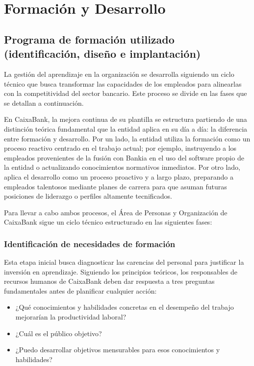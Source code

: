 \chapter{Formación y Desarrollo}

\section{Programa de formación utilizado (identificación, diseño e implantación)}

La gestión del aprendizaje en la organización se desarrolla siguiendo un ciclo técnico que busca transformar las capacidades de los empleados para alinearlas con la competitividad del sector bancario. Este proceso se divide en las fases que se detallan a continuación.

En CaixaBank, la mejora continua de su plantilla se estructura partiendo de una distinción teórica fundamental que la entidad aplica en su día a día: la diferencia entre formación y desarrollo. Por un lado, la entidad utiliza la formación como un proceso reactivo centrado en el trabajo actual; por ejemplo, instruyendo a los empleados provenientes de la fusión con Bankia en el uso del software propio de la entidad o actualizando conocimientos normativos inmediatos. Por otro lado, aplica el desarrollo como un proceso proactivo y a largo plazo, preparando a empleados talentosos mediante planes de carrera para que asuman futuras posiciones de liderazgo o perfiles altamente tecnificados.

Para llevar a cabo ambos procesos, el Área de Personas y Organización de CaixaBank sigue un ciclo técnico estructurado en las siguientes fases:

\subsection{Identificación de necesidades de formación}

Esta etapa inicial busca diagnosticar las carencias del personal para justificar la inversión en aprendizaje. Siguiendo los principios teóricos, los responsables de recursos humanos de CaixaBank deben dar respuesta a tres preguntas fundamentales antes de planificar cualquier acción:

\begin{itemize}
    \item ¿Qué conocimientos y habilidades concretas en el desempeño del trabajo mejorarían la productividad laboral?
    \item ¿Cuál es el público objetivo?
    \item ¿Puedo desarrollar objetivos mensurables para esos conocimientos y habilidades?
\end{itemize}

